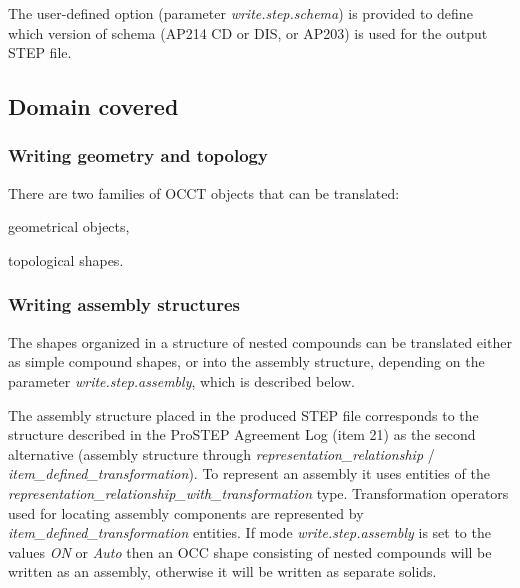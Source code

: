 The user-\/defined option (parameter {\itshape write.\+step.\+schema}) is provided to define which version of schema (A\+P214 CD or D\+IS, or A\+P203) is used for the output S\+T\+EP file.\hypertarget{occt_user_guides__step_occt_step_3_2}{}\subsection{Domain covered}\label{occt_user_guides__step_occt_step_3_2}
\hypertarget{occt_user_guides__step_occt_step_3_2_1}{}\subsubsection{Writing geometry and topology}\label{occt_user_guides__step_occt_step_3_2_1}
There are two families of O\+C\+CT objects that can be translated\+:
\begin{DoxyItemize}
\item geometrical objects,
\item topological shapes.
\end{DoxyItemize}\hypertarget{occt_user_guides__step_occt_step_3_2_2}{}\subsubsection{Writing assembly structures}\label{occt_user_guides__step_occt_step_3_2_2}
The shapes organized in a structure of nested compounds can be translated either as simple compound shapes, or into the assembly structure, depending on the parameter {\itshape write.\+step.\+assembly}, which is described below.

The assembly structure placed in the produced S\+T\+EP file corresponds to the structure described in the Pro\+S\+T\+EP Agreement Log (item 21) as the second alternative (assembly structure through {\itshape representation\+\_\+relationship} / {\itshape item\+\_\+defined\+\_\+transformation}). To represent an assembly it uses entities of the {\itshape representation\+\_\+relationship\+\_\+with\+\_\+transformation} type. Transformation operators used for locating assembly components are represented by {\itshape item\+\_\+defined\+\_\+transformation} entities. If mode {\itshape write.\+step.\+assembly} is set to the values {\itshape ON} or {\itshape Auto} then an O\+CC shape consisting of nested compounds will be written as an assembly, otherwise it will be written as separate solids.


